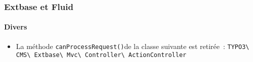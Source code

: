%

\begin{frame}[fragile]
	\frametitle{Extbase et Fluid}
	\framesubtitle{Divers}


	\begin{itemize}
		\item La méthode \small\texttt{canProcessRequest()}\normalsize de la classe suivante est retirée~:
			\smaller\texttt{TYPO3\textbackslash
				CMS\textbackslash
				Extbase\textbackslash
				Mvc\textbackslash
				Controller\textbackslash
				ActionController}\normalsize
	\end{itemize}

\end{frame}


